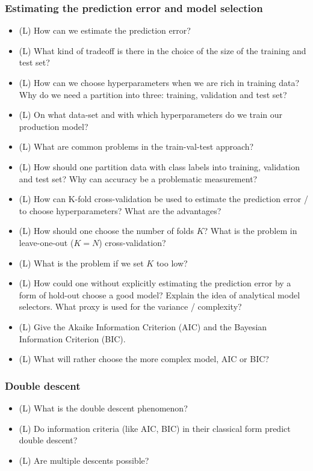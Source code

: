\subsubsection*{Estimating the prediction error and model selection}
\begin{itemize}
    \item (L) How can we estimate the prediction error?
    \answerboxM
    \item (L) What kind of tradeoff is there in the choice of the size of the training and test set?
    \answerboxM
    \item (L) How can we choose hyperparameters when we are rich in training data? Why do we need a
    partition into three: training, validation and test set?
    \answerboxM
    \item (L) On what data-set and with which hyperparameters do we train our production model?
    \answerboxM
    \item (L) What are common problems in the train-val-test approach?
    \answerboxM
    \item (L) How should one partition data with class labels into training, validation and test set? Why can accuracy be a problematic measurement?
    \answerboxM
    \item (L) How can K-fold cross-validation be used to estimate the prediction error / to choose hyperparameters? What are the advantages?
    \answerboxM
    \item (L) How should one choose the number of folds $K$? What is the problem in leave-one-out ($K=N$) cross-validation?
    \answerboxM
    \item (L) What is the problem if we set $K$ too low?
    \answerboxM
    \item (L) How could one without explicitly estimating the prediction error by a form of hold-out
    choose a good model? Explain the idea of analytical model selectors. What proxy is used for 
    the variance / complexity?
    \answerboxM
    \item (L) Give the Akaike Information Criterion (AIC) and the Bayesian Information Criterion (BIC).
    \answerboxM
    \item (L) What will rather choose the more complex model, AIC or BIC?
    \answerboxM
\end{itemize}

\subsubsection*{Double descent}
\begin{itemize}
    \item (L) What is the double descent phenomenon?
    \answerboxM
    \item (L) Do information criteria (like AIC, BIC) in their classical form predict double descent?
    \answerboxM
    \item (L) Are multiple descents possible?
    \answerboxS
\end{itemize}

